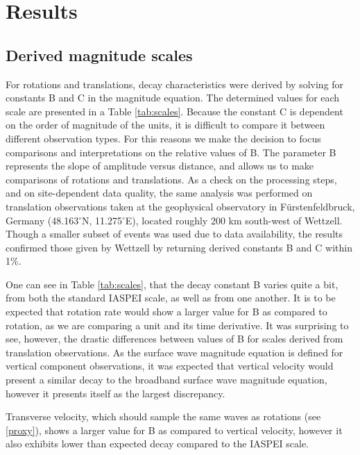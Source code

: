 \documentclass{gji}
\begin{document}
\section{Results}\label{sec:results}
\subsection{Derived magnitude scales}
For rotations and translations, decay characteristics were derived by solving for constants B and C in the magnitude equation. The determined values for each scale are presented in a Table \ref{tab:scales}. Because the constant C is dependent on the order of magnitude of the units, it is difficult to compare it between different observation types. For this reasons we make the decision to focus comparisons and interpretations on the relative values of B. The parameter B represents the slope of amplitude versus distance, and allows us to make comparisons of rotations and translations. As a check on the processing steps, and on site-dependent data quality, the same analysis was performed on translation observations taken at the geophysical observatory in F\"urstenfeldbruck, Germany (48.163$^\circ$N, 11.275$^\circ$E), located roughly 200 km south-west of Wettzell. Though a smaller subset of events was used due to data availability, the results confirmed those given by Wettzell by returning derived constants B and C within 1\%. %

One can see in Table \ref{tab:scales}, that the decay constant B varies quite a bit, from both the standard IASPEI scale, as well as from one another. It is to be expected that rotation rate would show a larger value for B as compared to rotation, as we are comparing a unit and its time derivative. %
It was surprising to see, however, the drastic differences between values of B for scales derived from translation observations. As the surface wave magnitude equation is defined for vertical component observations, it was expected that vertical velocity would present a similar decay to the broadband surface wave magnitude equation, however it presents itself as the largest discrepancy. 

Transverse velocity, which should sample the same waves as rotations (see \ref{proxy}), shows a larger value for B as compared to vertical velocity, however it also exhibits lower than expected decay compared to the IASPEI scale. 


\end{document}
